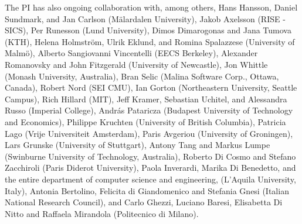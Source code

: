 \documentclass[12pt]{article}
\begin{document}
The PI has also ongoing collaboration with, among others, Hans Hansson, Daniel Sundmark, and Jan Carlson (M\"alardalen University), Jakob Axelsson (RISE - SICS), Per Runesson (Lund University), Dimos Dimarogonas and Jana Tumova (KTH), Helena Holmstr\"om, Ulrik Eklund, and Romina Spalazzese (University of Malm\"o), Alberto Sangiovanni Vincentelli (EECS Berkeley),
Alexander Romanovsky and John Fitzgerald (University of Newcastle), Jon Whittle (Monash University, Australia), Bran Selic (Malina Software Corp., Ottawa, Canada), Robert Nord (SEI CMU), Ian Gorton
(Northeastern University, Seattle Campus), Rich Hillard (MIT), Jeff Kramer, Sebastian Uchitel, and Alessandra Russo (Imperial College), Andr\'as Pataricza (Budapest University of Technology and Economics), Philippe Kruchten (University of British Columbia), Patricia Lago (Vrije Universiteit Amsterdam), Paris Avgeriou (University of Groningen), Lars Grunske (University of Stuttgart), Antony Tang and Markus Lumpe (Swinburne University of Technology, Australia), Roberto Di Cosmo and Stefano Zacchiroli (Paris Diderot University), Paola Inverardi, Marika Di Benedetto, and the entire department of computer science and engineering, %
(L'Aquila University, Italy), Antonia Bertolino, Felicita di Giandomenico and Stefania Gnesi (Italian National Research Council), and Carlo Ghezzi, Luciano Baresi, Elisabetta Di Nitto and Raffaela Mirandola (Politecnico di Milano). %
\end{document}
